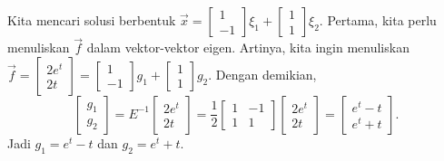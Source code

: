 \begin{example}
Kita mencari solusi berbentuk $\vec{x} = 
\left[ \begin{smallmatrix}
1 \\
-1
\end{smallmatrix} \right] \xi_1 +
\left[ \begin{smallmatrix}
1 \\
1
\end{smallmatrix} \right] \xi_2$.  Pertama, kita perlu menuliskan $\vec{f}$
dalam vektor-vektor eigen.
Artinya, kita ingin menuliskan $\vec{f} = 
\left[ \begin{smallmatrix}
2e^t \\
2t
\end{smallmatrix} \right] = 
\left[ \begin{smallmatrix}
1 \\
-1
\end{smallmatrix} \right] g_1 +
\left[ \begin{smallmatrix}
1 \\
1
\end{smallmatrix} \right] g_2$.  Dengan demikian,
\begin{equation*}
\begin{bmatrix}
g_1 \\
g_2
\end{bmatrix} = 
E^{-1}
\begin{bmatrix}
2e^t \\
2t
\end{bmatrix}
=
\frac{1}{2}
\begin{bmatrix}
1 & -1 \\
1 & 1
\end{bmatrix}
\begin{bmatrix}
2e^t \\
2t
\end{bmatrix}
=
\begin{bmatrix}
e^t-t \\
e^t+t
\end{bmatrix} .
\end{equation*}
Jadi $g_1 = e^t-t$ dan $g_2 = e^t+t$.


\end{example}
